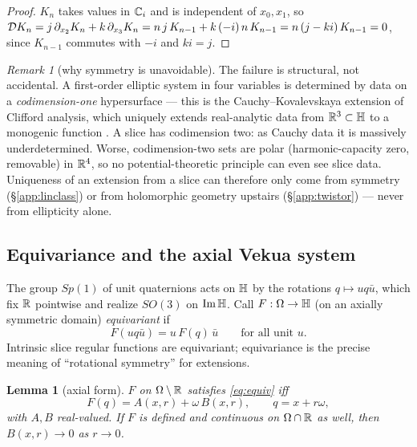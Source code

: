 \documentclass[11pt]{amsart}
\newtheorem{lemma}[theorem]{Lemma}
\theoremstyle{definition}
\theoremstyle{remark}
\newtheorem{remark}[theorem]{Remark}
\begin{document}
\begin{proof}
$K_n$ takes values in $\mathbb{C}_i$ and is independent of $x_0,x_1$, so
$\mathcal{D} K_n=j\,\partial_{x_2}K_n+k\,\partial_{x_3}K_n
=n\,j\,K_{n-1}+k\,(-i)\,n\,K_{n-1}=n\,(j-ki)\,K_{n-1}=0$,
since $K_{n-1}$ commutes with $-i$ and $ki=j$.
\end{proof}

\begin{remark}[why symmetry is unavoidable]\label{rem:codim}
The failure is structural, not accidental.  A first-order elliptic system
in four variables is determined by data on a \emph{codimension-one}
hypersurface --- this is the Cauchy--Kovalevskaya extension of Clifford
analysis, which uniquely extends real-analytic data from
$\mathbb{R}^3\subset\mathbb{H}$ to a monogenic function \cite{app-BDS}.  A slice has
codimension two: as Cauchy data it is massively underdetermined.  Worse,
codimension-two sets are polar (harmonic-capacity zero, removable) in
$\mathbb{R}^4$, so no potential-theoretic principle can even see slice data.
Uniqueness of an extension from a slice can therefore only come from
symmetry (\S\ref{app:linclass}) or from holomorphic geometry upstairs
(\S\ref{app:twistor}) --- never from ellipticity alone.
\end{remark}

\subsection{Equivariance and the axial Vekua system}\label{app:axial}

The group $Sp(1)$ of unit quaternions acts on $\mathbb{H}$ by the rotations
$q\mapsto uq\bar u$, which fix $\mathbb{R}$ pointwise and realize $SO(3)$ on
$\operatorname{Im}\mathbb{H}$.  Call $F:\Omega\to\mathbb{H}$ (on an axially symmetric domain)
\emph{equivariant} if
\begin{equation}\label{eq:equiv}
F(uq\bar u)=u\,F(q)\,\bar u\qquad\text{for all unit }u.
\end{equation}
Intrinsic slice regular functions are equivariant; equivariance is the
precise meaning of ``rotational symmetry'' for extensions.

\begin{lemma}[axial form]\label{lem:axialform}
$F$ on $\Omega\setminus\mathbb{R}$ satisfies \eqref{eq:equiv} iff
\[
F(q)=A(x,r)+\omega\,B(x,r),\qquad q=x+r\omega,
\]
with $A,B$ real-valued.  If $F$ is defined and continuous on
$\Omega\cap\mathbb{R}$ as well, then $B(x,r)\to0$ as $r\to0$.
\end{lemma}
\end{document}
